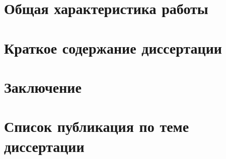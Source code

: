 \documentclass[a5paper,12pt,twoside]{article}
\begin{document}

\section*{Общая характеристика работы}

\section*{Краткое содержание диссертации}

\section*{Заключение}

\section*{Список публикация по теме диссертации}
\begin{enumerate}
  
\end{enumerate}

\end{document}
